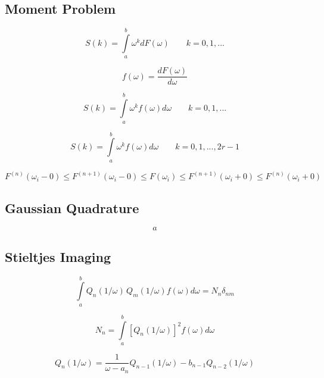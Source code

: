 \subsection{Moment Problem}

\begin{equation}
  S(k) = \int\limits_a^b \omega^k dF(\omega) \quad\quad k=0,1,...
\end{equation}

\begin{equation}
  f(\omega) = \frac{dF(\omega)}{d\omega}
\end{equation}

\begin{equation}
  S(k) = \int\limits_a^b \omega^k f(\omega) d\omega \quad\quad k=0,1,...
\end{equation}

\begin{equation}
  S(k) = \int\limits_a^b \omega^k f(\omega) d\omega \quad\quad k=0,1,...,2r-1
\end{equation}


\begin{equation}
  F^{(n)}(\omega_i - 0) \le F^{(n+1)}(\omega_i - 0) \le F(\omega_i)
  \le F^{(n+1)}(\omega_i + 0) \le F^{(n)}(\omega_i + 0)
\end{equation}




\subsection{Gaussian Quadrature}
\begin{equation}
a
\end{equation}



\subsection{Stieltjes Imaging}

\begin{equation}
  \int\limits_a^b Q_n(1/\omega) \, Q_m(1/\omega) f(\omega) d\omega = N_n \delta_{nm}
\end{equation}

\begin{equation}
  N_n = \int\limits_a^b \left[ Q_n(1/\omega) \right]^2 f(\omega) d\omega
\end{equation}

\begin{equation}
  Q_n(1/\omega) = \frac{1}{\omega - a_n} Q_{n-1}(1/\omega) - b_{n-1} Q_{n-2}(1/\omega)
\end{equation}

